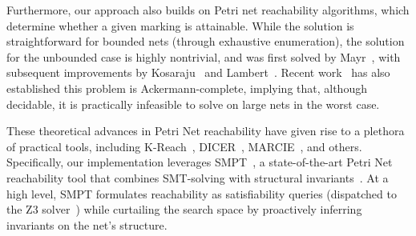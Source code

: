 Furthermore, our approach also builds on Petri net reachability algorithms, which determine whether a given marking is attainable. While the solution is straightforward for bounded nets (through exhaustive enumeration), the solution for the unbounded case is highly nontrivial, and was first solved by Mayr~\cite{Ma81}, with subsequent improvements by Kosaraju~\cite{Ko82} and Lambert~\cite{La92}. Recent work~\cite{CzWo22} has also established this problem is Ackermann-complete, implying that, although decidable, it is practically infeasible to solve on large nets in the worst case.

These theoretical advances in Petri Net reachability have given rise to a plethora of practical tools, including K-Reach~\cite{DiLa20}, DICER~\cite{XiZhLi21}, MARCIE~\cite{HeRoSc13}, and others. 
%
Specifically, our implementation leverages SMPT~\cite{AmDa23}, a state-of-the-art Petri Net reachability tool that combines SMT-solving with structural invariants~\cite{AmBeDa21, AmDaHu22}. At a high level, SMPT formulates reachability as satisfiability queries (dispatched to the Z3 solver~\cite{DeBj08}) while curtailing the search space by proactively inferring invariants on the net's structure.
%


 
 






